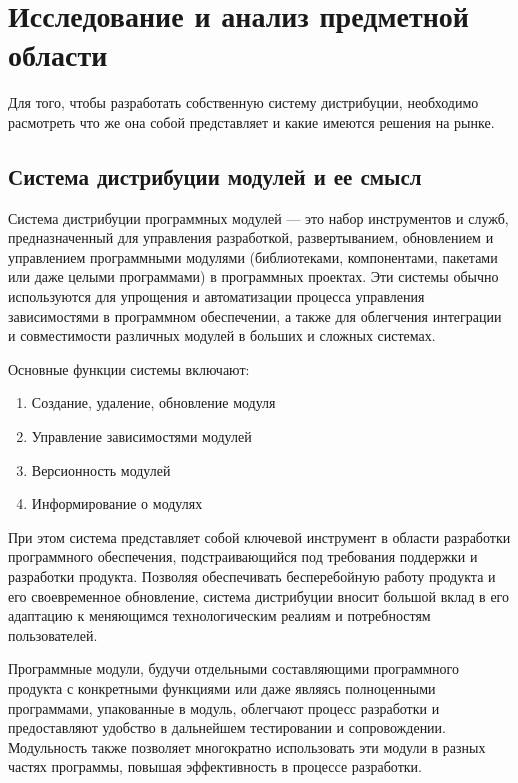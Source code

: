 \chapter{Исследование и анализ предметной области}
\label{cha:analysis}
%
%
Для того, чтобы разработать собственную систему дистрибуции, необходимо расмотреть что же она собой представляет и какие имеются решения на рынке.

\section{Система дистрибуции модулей и ее смысл}

Система дистрибуции программных модулей — это набор инструментов и служб, предназначенный для управления разработкой, развертыванием, обновлением и управлением программными модулями (библиотеками, компонентами, пакетами или даже целыми программами) в программных проектах. Эти системы обычно используются для упрощения и автоматизации процесса управления зависимостями в программном обеспечении, а также для облегчения интеграции и совместимости различных модулей в больших и сложных системах.

Основные функции системы включают:

\begin{enumerate}
\item Создание, удаление, обновление модуля
\item Управление зависимостями модулей
\item Версионность модулей
\item Информирование о модулях
\end{enumerate}

При этом система представляет собой ключевой инструмент в области разработки программного обеспечения, подстраивающийся под требования поддержки и разработки продукта. Позволяя обеспечивать бесперебойную работу продукта и его своевременное обновление, система дистрибуции вносит большой вклад в его адаптацию к меняющимся технологическим реалиям и потребностям пользователей.

Программные модули, будучи отдельными составляющими программного продукта с конкретными функциями или даже являясь полноценными программами, упакованные в модуль, облегчают процесс разработки и предоставляют удобство в дальнейшем тестировании и сопровождении. Модульность также позволяет многократно использовать эти модули в разных частях программы, повышая эффективность в процессе разработки.

